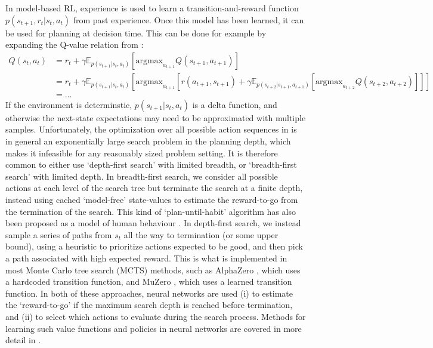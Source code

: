 In model-based RL, experience is used to learn a transition-and-reward function $p(s_{t+1}, r_t | s_t, a_t)$ from past experience.
Once this model has been learned, it can be used for planning at decision time.
This can be done for example by expanding the Q-value relation from :
{\small
\begin{align}
    \label{eq:Q-search}
    Q(s_t,a_t) &=  r_t + \gamma \mathbb{E}_{p(s_{t+1} | s_t, a_t)} \left [ \text{argmax}_{a_{t+1}} Q(s_{t+1}, a_{t+1}) \right ]\\
    &= r_t + \gamma \mathbb{E}_{p(s_{t+1} | s_t, a_t)} \left [ \text{argmax}_{a_{t+1}}
    \left [ r(a_{t+1}, s_{t+1}) + \gamma \mathbb{E}_{p(s_{t+2} | s_{t+1}, a_{t+1})} \left [ \text{argmax}_{a_{t+2}} Q(s_{t+2}, a_{t+2}) \right ] \right ] \right ] \\
    &= \ldots
\end{align}
}
If the environment is determinstic, $p(s_{t+1} | s_t, a_t)$ is a delta function, and otherwise the next-state expectations may need to be approximated with multiple samples.
Unfortunately, the optimization over all possible action sequences in  is in general an exponentially large search problem in the planning depth, which makes it infeasible for any reasonably sized problem setting.
It is therefore common to either use `depth-first search' with limited breadth, or `breadth-first search' with limited depth.
In breadth-first search, we consider all possible actions at each level of the search tree but terminate the search at a finite depth, instead using cached `model-free' state-values to estimate the reward-to-go from the termination of the search.
This kind of `plan-until-habit' algorithm has also been proposed as a model of human behaviour \citep{keramati2016adaptive}.
In depth-first search, we instead sample a series of paths from $s_t$ all the way to termination (or some upper bound), using a heuristic to prioritize actions expected to be good, and then pick a path associated with high expected reward.
This is what is implemented in most Monte Carlo tree search (MCTS) methods, such as AlphaZero \citep{silver2018general}, which uses a hardcoded transition function, and MuZero \citep{schrittwieser2020mastering}, which uses a learned transition function.
In both of these approaches, neural networks are used (i) to estimate the `reward-to-go' if the maximum search depth is reached before termination, and (ii) to select which actions to evaluate during the search process.
Methods for learning such value functions and policies in neural networks are covered in more detail in .

